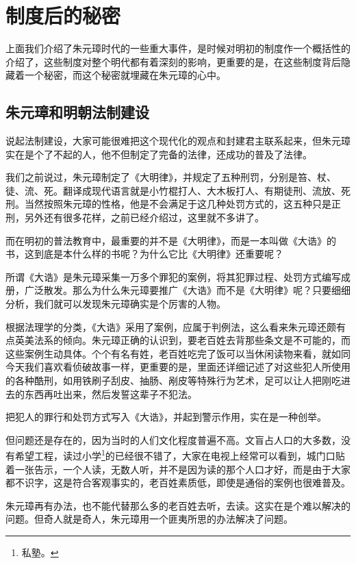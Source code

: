 \section{制度后的秘密}
\ifnum{}
	\begin{multicols}{\theparacolNo}
		\fi
		上面我们介绍了朱元璋时代的一些重大事件，是时候对明初的制度作一个概括性的介绍了，这些制度对整个明代都有着深刻的影响，更重要的是，在这些制度背后隐藏着一个秘密，而这个秘密就埋藏在朱元璋的心中。

		\subsection{朱元璋和明朝法制建设}
		说起法制建设，大家可能很难把这个现代化的观点和封建君主联系起来，但朱元璋实在是个了不起的人，他不但制定了完备的法律，还成功的普及了法律。

		我们之前说过，朱元璋制定了《大明律》，并规定了五种刑罚，分别是笞、杖、徒、流、死。翻译成现代语言就是小竹棍打人、大木板打人、有期徒刑、流放、死刑。当然按照朱元璋的性格，他是不会满足于这几种处罚方式的，这五种只是正刑，另外还有很多花样，之前已经介绍过，这里就不多讲了。

		而在明初的普法教育中，最重要的并不是《大明律》，而是一本叫做《大诰》的书，这到底是本什么样的书呢？为什么它比《大明律》还重要呢？

		所谓《大诰》是朱元璋采集一万多个罪犯的案例，将其犯罪过程、处罚方式编写成册，广泛散发。那么为什么朱元璋要推广《大诰》而不是《大明律》呢？只要细细分析，我们就可以发现朱元璋确实是个厉害的人物。

		根据法理学的分类，《大诰》采用了案例，应属于判例法，这么看来朱元璋还颇有点英美法系的倾向。朱元璋正确的认识到，要老百姓去背那些条文是不可能的，而这些案例生动具体。个个有名有姓，老百姓吃完了饭可以当休闲读物来看，就如同今天我们喜欢看侦破故事一样，更重要的是，里面还详细记述了对这些犯人所使用的各种酷刑，如用铁刷子刮皮、抽肠、剐皮等特殊行为艺术，足可以让人把刚吃进去的东西再吐出来，然后发誓这辈子不犯法。

		把犯人的罪行和处罚方式写入《大诰》，并起到警示作用，实在是一种创举。

		但问题还是存在的，因为当时的人们文化程度普遍不高。文盲占人口的大多数，没有希望工程，读过小学\footnote{私塾。}的已经很不错了，大家在电视上经常可以看到，城门口贴着一张告示，一个人读，无数人听，并不是因为读的那个人口才好，而是由于大家都不识字，这是符合客观事实的，老百姓素质低，即使是通俗的案例也很难普及。

		朱元璋再有办法，也不能代替那么多的老百姓去听，去读。这实在是个难以解决的问题。但奇人就是奇人，朱元璋用一个匪夷所思的办法解决了问题。


\end{multicols}

